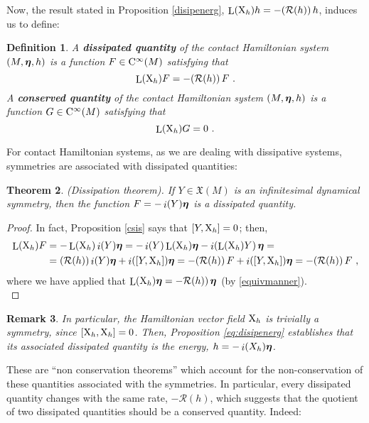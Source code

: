 \documentclass[12pt]{report}
\newtheorem{teor}{Theorem}[chapter]
\newtheorem{definition}[teor]{Definition}
\newtheorem{remark}[teor]{Remark}
\def\beq{\begin{equation}}
\def\eeq{\end{equation}}
\def\qed{\ifvmode\removelastskip\fi
{\unskip\nobreak\hfil\penalty50\hbox{}\nobreak\hfil
\hbox{\vrule height1.2ex width1.2ex}\parfillskip=0pt
\finalhyphendemerits=0 \par\smallskip}}
\def\vf{\mathfrak X}
\def\bmeta{\mbox{\boldmath $\eta$}}
\def\X{{\rm X}}
\def\Lie{\mathop{\rm L}\nolimits}
\def\inn{\mathop{i}\nolimits}
\def\Cinfty{{\rm C}^\infty}
\newcommand{\Reeb}{\mathcal{R}}
\begin{document}
Now, the result stated in Proposition \ref{disipenerg},
$\Lie(\X_h)h=-(\Reeb(h))\,h$,
induces us to define:

\begin{definition}\label{definition:diss-quan}
A \textbf{dissipated quantity} of the contact Hamiltonian system $(M,\bmeta,h)$ is a function 
$F\in\Cinfty(M)$ satisfying that 
\beq\label{eq:dissipation}
\Lie(\X_h)F=-(\Reeb(h))\,F \ .
\eeq
A \textbf{conserved quantity} of the contact Hamiltonian system $(M,\bmeta,h)$ is a function 
$G\in\Cinfty(M)$ satisfying that 
$$
\Lie(\X_h)G=0 \ .
$$
\end{definition}

For contact Hamiltonian systems, 
as we are dealing with dissipative systems,
symmetries are associated with dissipated
quantities:

\begin{teor}
\label{th:dissipation}
{\rm (Dissipation theorem).} 
If $Y\in\vf(M)$ is an infinitesimal dynamical symmetry,
then the function $F=-\inn(Y)\bmeta$
is a dissipated quantity.
\end{teor} 
\begin{proof}
In fact, Proposition \ref{csis} says that $[Y,\X_h]=0$; then,
\begin{align*}
\Lie(\X_h) F &=
-\Lie(\X_h) \inn(Y) \bmeta =
- \inn(Y) \Lie(\X_h)\bmeta - \inn(\Lie(\X_h)Y)\, \bmeta =
\\
&=
(\Reeb(h)) \inn(Y)\bmeta + \inn([Y,\X_h]) \bmeta =
 -(\Reeb(h))\, F + \inn([Y,\X_h]) \bmeta =
 -(\Reeb(h))\, F\ ,
\end{align*}
where we have applied that $\Lie(\X_h)\bmeta=-\Reeb(h))\,\bmeta$ (by \eqref{equivmanner}).
\\ \qed\end{proof}

\begin{remark}{\rm
In particular, the Hamiltonian vector field $\X_h$ is
trivially a symmetry, since $[\X_h,\X_h]=0$.
Then, Proposition \eqref{eq:disipenerg}
establishes that its associated dissipated quantity is the energy, 
$h=-\inn(X_h)\bmeta$.
}\end{remark}

These are ``non conservation theorems''
which account for the non-conservation of these quantities associated with the symmetries.
In particular, every dissipated quantity changes with the same rate, $-\Reeb(h)$, 
which suggests that the quotient of two dissipated quantities should be a conserved quantity. 
Indeed:
\end{document}
